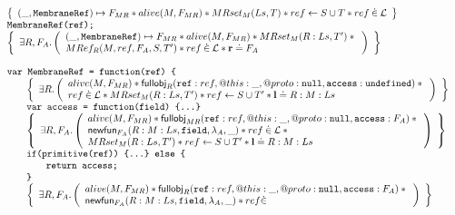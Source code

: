 \documentclass[a4paper,notitlepage]{report}
\begin{document}
\begin{figure}
  \[
    \begin{array}{l}
      \logic{
        (\_,\js{MembraneRef}) \pointsto F_{MR} \sep
        alive(M, F_{MR}) \sep MRset_M(Ls,T) \sep ref \bp S \cup T \sep ref \dotin \loc
      } \\
      \tjs{MembraneRef(ref);} \\
      \logic{
        \exists R, F_A \st \args{
          (\_,\js{MembraneRef}) \pointsto F_{MR} \sep
          alive(M, F_{MR}) \sep MRset_M(R:Ls,T') \sep {} \\
          MRef_{R}(M,ref,F_A,S,T') \sep ref \dotin \loc \sep \rv \doteq F_A
        }
      } \\
      \\
      \tjs{var MembraneRef = function(ref) \{} \\
        \indblock{
          \logic{
            \exists R \st \args{
              alive(M, F_{MR}) \sep  \fullobj_{R}(\js{ref}: ref, @this: \_, @proto: \nil, \js{access}:
                \und) \sep {} \\
              ref \dotin \loc \sep
              MRset_M(R:Ls,T') \sep ref \bp S \cup T' \sep \ls \doteq R:M:Ls
            }
          } \\
          \tjs{var access = function(field) \{...\}} \\
          \logic{
            \exists R,F_A \st \args{
              alive(M, F_{MR}) \sep \fullobj_{MR}(\js{ref}: ref, @this: \_, @proto: \nil, \js{access}:
                F_A) \sep {} \\
              \newfun_{F_A}(R:M:Ls, \js{field}, \lambda_A, \_) \sep ref \dotin
              \loc \sep {} \\
              MRset_M(R:Ls,T') \sep ref \bp S \cup T' \sep \ls \doteq R:M:Ls
            }
          } \\
          \tjs{if(primitive(ref)) \{...\} else \{} \\
            \indblock{
              \tjs{return access;} \\
            }
          \tjs{\}} \\
          \logic{
            \exists R,F_A \st \args{
              alive(M, F_{MR}) \sep \fullobj_{R}(\js{ref}: ref, @this: \_, @proto: \nil, \js{access}:
                F_A) \sep {} \\
              \newfun_{F_A}(R:M:Ls, \js{field}, \lambda_A, \_) \sep ref \dotin
}}}
\end{array}\]
\end{figure}
\end{document}
